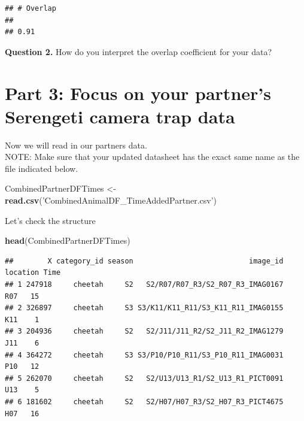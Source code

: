\documentclass[]{book}
\newenvironment{Shaded}{\begin{snugshade}}{\end{snugshade}}
\newcommand{\KeywordTok}[1]{\textcolor[rgb]{0.13,0.29,0.53}{\textbf{#1}}}
\newcommand{\NormalTok}[1]{#1}
\newcommand{\OperatorTok}[1]{\textcolor[rgb]{0.81,0.36,0.00}{\textbf{#1}}}
\newcommand{\StringTok}[1]{\textcolor[rgb]{0.31,0.60,0.02}{#1}}
\begin{document}
\begin{Shaded}
\end{Shaded}

\begin{verbatim}
## # Overlap
## 
## 0.91
\end{verbatim}

\textbf{Question 2.} How do you interpret the overlap coefficient for your data?

\hypertarget{part-3-focus-on-your-partners-serengeti-camera-trap-data}{%
\section{Part 3: Focus on your partner's Serengeti camera trap data}\label{part-3-focus-on-your-partners-serengeti-camera-trap-data}}

Now we will read in our partners data.\\
NOTE: Make sure that your updated datasheet has the exact same name as the file indicated below.

\begin{Shaded}
\begin{Highlighting}[]
\NormalTok{CombinedPartnerDFTimes <-}\StringTok{ }\KeywordTok{read.csv}\NormalTok{(}\StringTok{'CombinedAnimalDF_TimeAddedPartner.csv'}\NormalTok{)}
\end{Highlighting}
\end{Shaded}

Let's check the structure

\begin{Shaded}
\begin{Highlighting}[]
\KeywordTok{head}\NormalTok{(CombinedPartnerDFTimes)}
\end{Highlighting}
\end{Shaded}

\begin{verbatim}
##        X category_id season                           image_id location Time
## 1 247918     cheetah     S2   S2/R07/R07_R3/S2_R07_R3_IMAG0167      R07   15
## 2 326897     cheetah     S3 S3/K11/K11_R11/S3_K11_R11_IMAG0155      K11    1
## 3 204936     cheetah     S2   S2/J11/J11_R2/S2_J11_R2_IMAG1279      J11    6
## 4 364272     cheetah     S3 S3/P10/P10_R11/S3_P10_R11_IMAG0031      P10   12
## 5 262070     cheetah     S2   S2/U13/U13_R1/S2_U13_R1_PICT0091      U13    5
## 6 181602     cheetah     S2   S2/H07/H07_R3/S2_H07_R3_PICT4675      H07   16
\end{verbatim}
\end{document}
